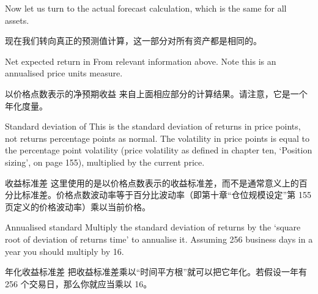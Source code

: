 \begin{englishblock} Now let us turn to the actual forecast calculation, which is the same for all assets. \end{englishblock}

\begin{chineseblock}现在我们转向真正的预测值计算，这一部分对所有资产都是相同的。\end{chineseblock}


\begin{englishblock} Net expected return in From relevant information above. Note this is an annualised price units measure. \end{englishblock}

\begin{chineseblock}以价格点数表示的净预期收益 来自上面相应部分的计算结果。请注意，它是一个年化度量。\end{chineseblock}

\bipairgap

\begin{englishblock} Standard deviation of This is the standard deviation of returns in price points, not returns percentage points as normal. The volatility in price points is equal to the percentage point volatility (price volatility as defined in chapter ten, ‘Position sizing', on page 155), multiplied by the current price. \end{englishblock}

\begin{chineseblock}收益标准差 这里使用的是以价格点数表示的收益标准差，而不是通常意义上的百分比标准差。价格点数波动率等于百分比波动率（即第十章“仓位规模设定”第 155 页定义的价格波动率）乘以当前价格。\end{chineseblock}

\bipairgap

\begin{englishblock} Annualised standard Multiply the standard deviation of returns by the ‘square root of deviation of returns time' to annualise it. Assuming 256 business days in a year you should multiply by 16. \end{englishblock}

\begin{chineseblock}年化收益标准差 把收益标准差乘以“时间平方根”就可以把它年化。若假设一年有 256 个交易日，那么你就应当乘以 16。 \end{chineseblock}

